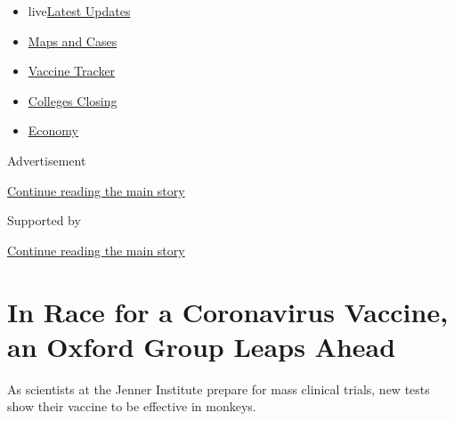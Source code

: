 \begin{itemize}
\tightlist
\item
  live\href{https://www.nytimes3xbfgragh.onion/2020/08/21/world/covid-19-coronavirus.html?name=styln-coronavirus-national\&region=TOP_BANNER\&variant=undefined\&block=storyline_menu_recirc\&action=click\&pgtype=Article\&impression_id=ed24a4f1-e397-11ea-8a62-75d80e5d68be}{Latest
  Updates}
\item
  \href{https://www.nytimes3xbfgragh.onion/interactive/2020/us/coronavirus-us-cases.html?name=styln-coronavirus-national\&region=TOP_BANNER\&variant=undefined\&block=storyline_menu_recirc\&action=click\&pgtype=Article\&impression_id=ed24a4f2-e397-11ea-8a62-75d80e5d68be}{Maps
  and Cases}
\item
  \href{https://www.nytimes3xbfgragh.onion/interactive/2020/science/coronavirus-vaccine-tracker.html?name=styln-coronavirus-national\&region=TOP_BANNER\&variant=undefined\&block=storyline_menu_recirc\&action=click\&pgtype=Article\&impression_id=ed24cc00-e397-11ea-8a62-75d80e5d68be}{Vaccine
  Tracker}
\item
  \href{https://www.nytimes3xbfgragh.onion/2020/08/19/us/colleges-closing-covid.html?name=styln-coronavirus-national\&region=TOP_BANNER\&variant=undefined\&block=storyline_menu_recirc\&action=click\&pgtype=Article\&impression_id=ed24cc01-e397-11ea-8a62-75d80e5d68be}{Colleges
  Closing}
\item
  \href{https://www.nytimes3xbfgragh.onion/live/2020/08/20/business/stock-market-today-coronavirus?name=styln-coronavirus-national\&region=TOP_BANNER\&variant=undefined\&block=storyline_menu_recirc\&action=click\&pgtype=Article\&impression_id=ed24cc02-e397-11ea-8a62-75d80e5d68be}{Economy}
\end{itemize}

Advertisement

\protect\hyperlink{after-top}{Continue reading the main story}

Supported by

\protect\hyperlink{after-sponsor}{Continue reading the main story}

\hypertarget{in-race-for-a-coronavirus-vaccine-an-oxford-group-leaps-ahead}{%
\section{In Race for a Coronavirus Vaccine, an Oxford Group Leaps
Ahead}\label{in-race-for-a-coronavirus-vaccine-an-oxford-group-leaps-ahead}}

As scientists at the Jenner Institute prepare for mass clinical trials,
new tests show their vaccine to be effective in monkeys.


